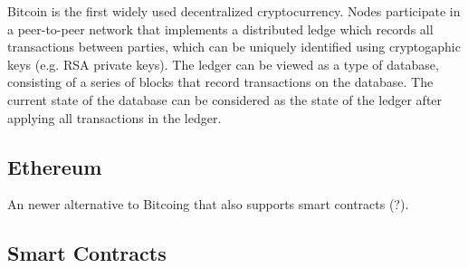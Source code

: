 \documentclass[10pt,a4paper]{article}
\begin{document}
Bitcoin \cite{nakamoto2009bitcoin} is the first widely used decentralized cryptocurrency. Nodes participate in a peer-to-peer network that implements a distributed ledge which records all transactions between parties, which can be uniquely identified using cryptogaphic keys (e.g. RSA private keys). The ledger can be viewed as a type of database, consisting of a series of blocks that record transactions on the database. The current state of the database can be considered as the state of the ledger after applying all transactions in the ledger.

\subsection*{Ethereum}

An newer alternative to Bitcoing that also supports smart contracts (?).

\subsection*{Smart Contracts}





\end{document}
